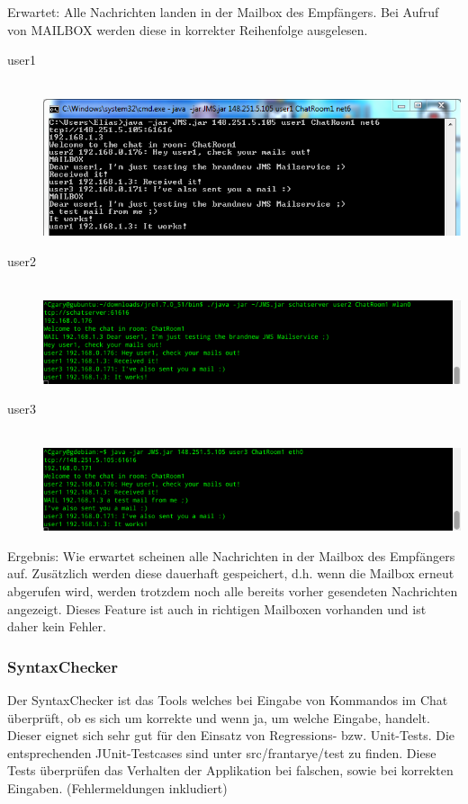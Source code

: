 \documentclass[11pt, a4paper]{article}
\begin{document}
Erwartet: Alle Nachrichten landen in der Mailbox des Empfängers. Bei Aufruf von MAILBOX werden diese in korrekter Reihenfolge ausgelesen.

\begin{center}
\begin{description}
\item[user1] \hfill \\   \includegraphics[width=6in]{pic/mail_user1.png}
\item[user2] \hfill \\   \includegraphics[width=6in]{pic/mail_user2.png}
\item[user3] \hfill \\   \includegraphics[width=6in]{pic/mail_user3.png}
\end{description}
\end{center}

Ergebnis: Wie erwartet scheinen alle Nachrichten in der Mailbox des Empfängers auf. Zusätzlich werden diese dauerhaft gespeichert, d.h. wenn die Mailbox erneut
abgerufen wird, werden trotzdem noch alle bereits vorher gesendeten Nachrichten angezeigt. Dieses Feature ist auch in richtigen Mailboxen vorhanden und ist
daher kein Fehler.

\newpage

\subsubsection{SyntaxChecker}
Der SyntaxChecker ist das Tools welches bei Eingabe von Kommandos im Chat überprüft, ob es sich um korrekte und wenn ja, um welche Eingabe, handelt.
Dieser eignet sich sehr gut für den Einsatz von Regressions- bzw. Unit-Tests.
Die entsprechenden JUnit-Testcases sind unter src/frantarye/test zu finden.
Diese Tests überprüfen das Verhalten der Applikation bei falschen, sowie bei korrekten Eingaben. (Fehlermeldungen inkludiert)
\end{document}
